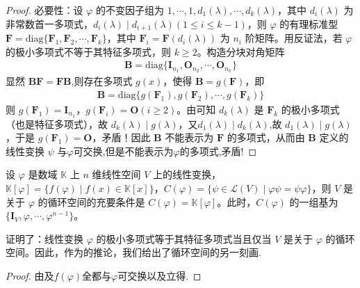 \documentclass[../../main.tex]{subfiles}%
\begin{document}
\begin{proof}
{\heiti 必要性：}设 $\varphi$ 的不变因子组为 $1,\cdots,1,d_1(\lambda),\cdots,d_k(\lambda)$，其中 $d_i(\lambda)$ 为非常数首一多项式，$d_i(\lambda)\mid d_{i + 1}(\lambda) (1\leqslant  i\leqslant  k - 1)$，则 $\varphi$ 的有理标准型 $\boldsymbol{F}=\mathrm{diag}\{\boldsymbol{F}_1,\boldsymbol{F}_2,\cdots,\boldsymbol{F}_k\}$，其中 $\boldsymbol{F}_i = \boldsymbol{F}(d_i(\lambda))$ 为 $n_i$ 阶矩阵。用反证法，若 $\varphi$ 的极小多项式不等于其特征多项式，则 $k\geqslant  2$。构造分块对角矩阵
\begin{align*}
\boldsymbol{B}=\mathrm{diag}\{\boldsymbol{I}_{n_1},\boldsymbol{O}_{n_2},\cdots,\boldsymbol{O}_{n_k}\}
\end{align*}
显然 $\boldsymbol{BF}=\boldsymbol{FB}$,则存在多项式 $g(x)$，使得 $\boldsymbol{B}=g(\boldsymbol{F})$，即
\begin{align*}
\boldsymbol{B}=\mathrm{diag}\{g(\boldsymbol{F}_1),g(\boldsymbol{F}_2),\cdots,g(\boldsymbol{F}_k)\}
\end{align*}
则 $g(\boldsymbol{F}_1)=\boldsymbol{I}_{n_1}$，$g(\boldsymbol{F}_i)=\boldsymbol{O}(i\geqslant  2)$。由可知 $d_k(\lambda)$ 是 $\boldsymbol{F}_k$ 的极小多项式（也是特征多项式），故 $d_k(\lambda)\mid g(\lambda)$，又$d_1(\lambda)\mid d_k(\lambda)$,故 $d_1(\lambda)\mid g(\lambda)$，于是 $g(\boldsymbol{F}_1)=\boldsymbol{O}$，矛盾！因此 $\boldsymbol{B}$ 不能表示为 $\boldsymbol{F}$ 的多项式，从而由 $\boldsymbol{B}$ 定义的线性变换 $\psi$ 与$\varphi$可交换,但是不能表示为$\varphi$的多项式,矛盾!

\end{proof}

\begin{corollary}\label{corollary:循环子空间的另一种刻画}
设 $\varphi$ 是数域 $\mathbb{K}$ 上 $n$ 维线性空间 $V$ 上的线性变换，$\mathbb{K}[\varphi]=\{f(\varphi)\mid f(x)\in\mathbb{K}[x]\}$，$C(\varphi)=\{\psi\in\mathcal{L}(V)\mid\varphi\psi = \psi\varphi\}$，则 $V$ 是关于 $\varphi$ 的循环空间的充要条件是 $C(\varphi)=\mathbb{K}[\varphi]$。此时，$C(\varphi)$ 的一组基为 $\{\boldsymbol{I}_V,\varphi,\cdots,\varphi^{n - 1}\}$。 
\end{corollary}
\begin{note}
证明了：线性变换 $\varphi$ 的极小多项式等于其特征多项式当且仅当 $V$ 是关于 $\varphi$ 的循环空间。因此，作为的推论，我们给出了循环空间的另一刻画.
\end{note}
\begin{proof}

由及$f(\varphi)$全都与$\varphi$可交换以及立得.

\end{proof}
\end{document}
